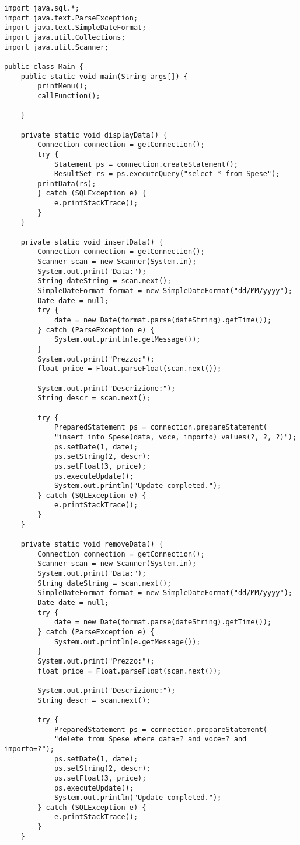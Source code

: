 \documentclass[a4paper, 10pt, titlepage]{article}
\begin{document}
\begin{lstlisting}[tabsize=2]
import java.sql.*;
import java.text.ParseException;
import java.text.SimpleDateFormat;
import java.util.Collections;
import java.util.Scanner;

public class Main {
	public static void main(String args[]) {
		printMenu();
		callFunction();

	}

	private static void displayData() {
		Connection connection = getConnection();
		try {
			Statement ps = connection.createStatement();
			ResultSet rs = ps.executeQuery("select * from Spese");
		printData(rs);
		} catch (SQLException e) {
			e.printStackTrace();
		}
	}
	
	private static void insertData() {
		Connection connection = getConnection();
		Scanner scan = new Scanner(System.in);
		System.out.print("Data:");
		String dateString = scan.next();
		SimpleDateFormat format = new SimpleDateFormat("dd/MM/yyyy");
		Date date = null;
		try {
			date = new Date(format.parse(dateString).getTime());
		} catch (ParseException e) {
			System.out.println(e.getMessage());
		}
		System.out.print("Prezzo:");
		float price = Float.parseFloat(scan.next());
		
		System.out.print("Descrizione:");
		String descr = scan.next();
		
		try {
			PreparedStatement ps = connection.prepareStatement(
			"insert into Spese(data, voce, importo) values(?, ?, ?)");
			ps.setDate(1, date);
			ps.setString(2, descr);
			ps.setFloat(3, price);
			ps.executeUpdate();
			System.out.println("Update completed.");
		} catch (SQLException e) {
			e.printStackTrace();
		}	
	}
	
	private static void removeData() {
		Connection connection = getConnection();
		Scanner scan = new Scanner(System.in);
		System.out.print("Data:");
		String dateString = scan.next();
		SimpleDateFormat format = new SimpleDateFormat("dd/MM/yyyy");
		Date date = null;
		try {
			date = new Date(format.parse(dateString).getTime());
		} catch (ParseException e) {
			System.out.println(e.getMessage());
		}
		System.out.print("Prezzo:");
		float price = Float.parseFloat(scan.next());
		
		System.out.print("Descrizione:");
		String descr = scan.next();
		
		try {
			PreparedStatement ps = connection.prepareStatement(
			"delete from Spese where data=? and voce=? and importo=?");
			ps.setDate(1, date);
			ps.setString(2, descr);
			ps.setFloat(3, price);
			ps.executeUpdate();
			System.out.println("Update completed.");
		} catch (SQLException e) {
			e.printStackTrace();
		}
	}
	

\end{lstlisting}
\end{document}
